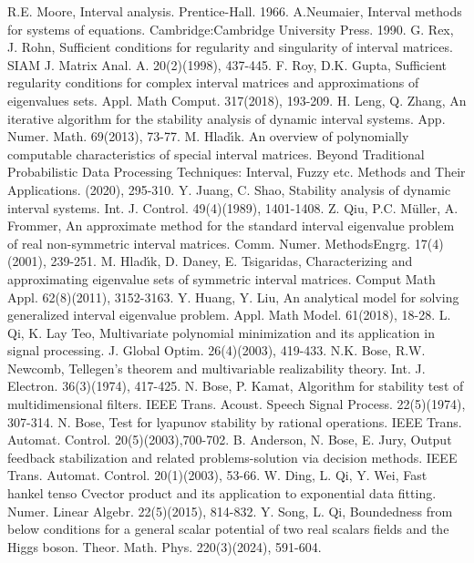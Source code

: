\documentclass[twoside]{article}
\begin{document}
%
%
\begin{thebibliography}{ }
 R.E. Moore, Interval analysis. Prentice-Hall. 1966.
 A.Neumaier, Interval methods for systems of equations. Cambridge:Cambridge University Press. 1990.
 G. Rex, J. Rohn, Sufficient conditions for regularity and singularity of interval matrices. SIAM J. Matrix Anal. A. 20(2)(1998), 437-445.
 F. Roy, D.K. Gupta, Sufficient regularity conditions for complex interval matrices and approximations of eigenvalues sets. Appl. Math Comput. 317(2018), 193-209.
 H. Leng, Q. Zhang, An iterative algorithm for the stability analysis of dynamic interval systems. App. Numer. Math. 69(2013), 73-77.
 M. Hlad\'{\i}k. An overview of polynomially computable characteristics of special interval matrices. Beyond Traditional Probabilistic Data Processing Techniques: Interval, Fuzzy etc. Methods and Their Applications. (2020), 295-310.
 Y. Juang, C. Shao, Stability analysis of dynamic interval systems. Int. J. Control. 49(4)(1989), 1401-1408.
 Z. Qiu, P.C. M\"{u}ller, A. Frommer, An approximate method for the standard interval eigenvalue problem of real non-symmetric interval matrices. Comm. Numer. MethodsEngrg. 17(4)(2001), 239-251.
 M. Hlad\'{\i}k, D. Daney, E. Tsigaridas, Characterizing and approximating eigenvalue sets of symmetric interval matrices. Comput Math Appl. 62(8)(2011), 3152-3163.
 Y. Huang, Y. Liu, An analytical model for solving generalized interval eigenvalue problem. Appl. Math Model. 61(2018), 18-28.
 L. Qi,  K. Lay Teo, Multivariate polynomial minimization and its application in signal processing. J. Global Optim. 26(4)(2003), 419-433.
 N.K. Bose, R.W. Newcomb, Tellegen's theorem and multivariable realizability theory. Int. J. Electron. 36(3)(1974), 417-425.
 N. Bose, P. Kamat, Algorithm for stability test of multidimensional filters. IEEE Trans. Acoust. Speech Signal Process. 22(5)(1974), 307-314.
 N. Bose, Test for lyapunov stability by rational operations. IEEE Trans. Automat. Control. 20(5)(2003),700-702.
 B. Anderson, N. Bose, E. Jury, Output feedback stabilization and related problems-solution via decision methods. IEEE Trans. Automat. Control. 20(1)(2003), 53-66.
 W. Ding, L. Qi, Y. Wei, Fast hankel tenso Cvector product and its application to exponential data fitting. Numer. Linear Algebr. 22(5)(2015), 814-832.
 Y. Song, L. Qi, Boundedness from below conditions for a general scalar potential of two real scalars fields and the Higgs boson. Theor. Math. Phys. 220(3)(2024), 591-604.

\end{thebibliography}
\end{document}
